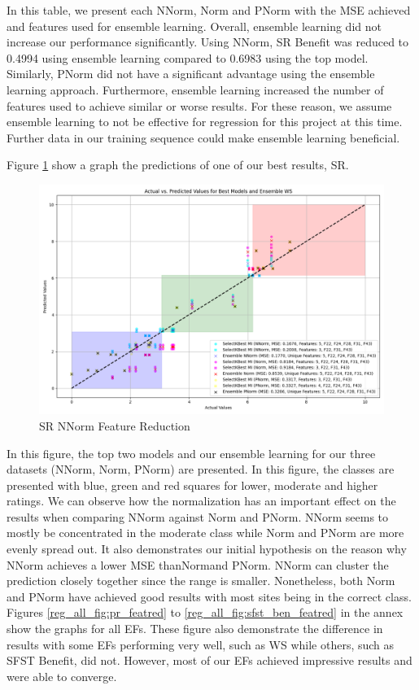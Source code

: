 \documentclass[12pt,letterpaper]{article}
\begin{document}
In this table, we present each \ac{NNorm}, \ac{Norm} and \ac{PNorm} with the MSE achieved and features used for ensemble learning.
Overall, ensemble learning did not increase our performance significantly.
Using \ac{NNorm}, \ac{SR} Benefit was reduced to 0.4994 using ensemble learning compared to 0.6983 using the top model.
Similarly, \ac{PNorm} did not have a significant advantage using the ensemble learning approach.
Furthermore, ensemble learning increased the number of features used to achieve similar or worse results.
For these reason, we assume ensemble learning to not be effective for regression for this project at this time.
Further data in our training sequence could make ensemble learning beneficial.



Figure \ref{reg_all_fig:ws_featred_big} show a graph the predictions of one of our best results, \ac{SR}.

\begin{figure}
    \centering
    \includegraphics[width=1\linewidth]{reg_section_all/featred_ensemble_learning/actual_vs_predicted_best_feature_selection_and_ensemble_WS_10.png}
    \caption{SR \ac{NNorm} Feature Reduction}
    \label{reg_all_fig:ws_featred_big}
\end{figure}
In this figure, the top two models and our ensemble learning for our three datasets (\ac{NNorm}, \ac{Norm}, \ac{PNorm}) are presented.
In this figure, the classes are presented with blue, green and red squares for lower, moderate and higher ratings.
We can observe how the normalization has an important effect on the results when comparing \ac{NNorm} against \ac{Norm} and \ac{PNorm}.
\ac{NNorm} seems to mostly be concentrated in the moderate class while \ac{Norm} and \ac{PNorm} are more evenly spread out.
It also demonstrates our initial hypothesis on the reason why \ac{NNorm} achieves a lower MSE than\ac{Norm}and \ac{PNorm}.
\ac{NNorm} can cluster the prediction closely together since the range is smaller.
Nonetheless, both \ac{Norm} and \ac{PNorm} have achieved good results with most sites being in the correct class.
Figures \ref{reg_all_fig:pr_featred} to \ref{reg_all_fig:sfst_ben_featred} in the annex show the graphs for all \ac{EF}s.
These figure also demonstrate the difference in results with some \ac{EF}s performing very well, such as \ac{WS} while others, such as \ac{SFST} Benefit, did not.
However, most of our \ac{EF}s achieved impressive results and were able to converge.
\end{document}

